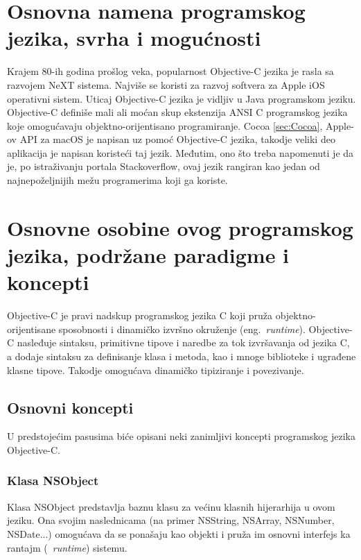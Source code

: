 \documentclass[a4paper]{article}
\begin{document}
{\section{Osnovna namena programskog jezika, svrha i mogućnosti}
\label{sec:namena}
Krajem 80-ih godina prošlog veka, popularnost Objective-C jezika je rasla sa razvojem NeXT sistema. Najviše se koristi za razvoj softvera za Apple iOS operativni sistem. Uticaj Objective-C jezika je vidljiv u Java programskom jeziku.
Objective-C definiše mali ali moćan skup ekstenzija ANSI C programskog jezika koje omogućavaju objektno-orijentisano programiranje. Cocoa \ref{sec:Cocoa}, Apple-ov API za macOS je napisan uz pomoć Objective-C jezika, takodje veliki deo aplikacija je napisan koristeći taj jezik. Međutim, ono što treba napomenuti je da je, po istraživanju portala Stackoverflow, ovaj jezik rangiran kao jedan od najnepoželjnijih mežu programerima koji ga koriste. \cite{stackoverflow}

\section{Osnovne osobine ovog programskog jezika, podržane paradigme i koncepti}
\label{sec:osobine}
Objective-C je pravi nadskup programskog jezika C koji pruža objektno-orijentisane sposobnosti i dinamičko izvršno okruženje (eng.~{\em runtime}). Objective-C nasleđuje sintaksu, primitivne tipove i naredbe za tok izvršavanja od jezika C, a dodaje sintaksu za definisanje klasa i metoda, kao i mnoge biblioteke i ugrađene klasne tipove. Takodje omogućava dinamičko tipiziranje i povezivanje.

\subsection{Osnovni koncepti}
U predstojećim pasusima biće opisani neki zanimljivi koncepti programskog jezika Objective-C.
\subsubsection{Klasa NSObject}
Klasa NSObject predstavlja baznu klasu za većinu klasnih hijerarhija u ovom jeziku. Ona svojim naslednicama (na primer NSString, NSArray, NSNumber, NSDate...) omogućava da se ponašaju kao objekti i pruža im osnovni interfejs ka rantajm (~{\em runtime}) sistemu.

}
\end{document}

